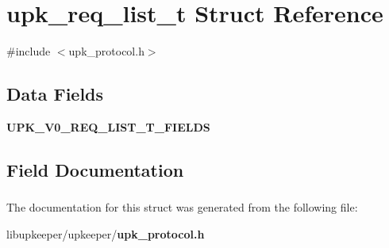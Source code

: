 \section{upk\_\-req\_\-list\_\-t Struct Reference}
\label{structupk__req__list__t}


{\ttfamily \#include $<$upk\_\-protocol.h$>$}

\subsection*{Data Fields}
\begin{DoxyCompactItemize}
\item 
{\bf UPK\_\-V0\_\-REQ\_\-LIST\_\-T\_\-FIELDS}
\end{DoxyCompactItemize}


\subsection{Field Documentation}
\subsubsection[{UPK\_\-V0\_\-REQ\_\-LIST\_\-T\_\-FIELDS}]{}\label{structupk__req__list__t_ae9269a149b7751fe056f25e9164bd980}


The documentation for this struct was generated from the following file:\begin{DoxyCompactItemize}
\item 
libupkeeper/upkeeper/{\bf upk\_\-protocol.h}\end{DoxyCompactItemize}
